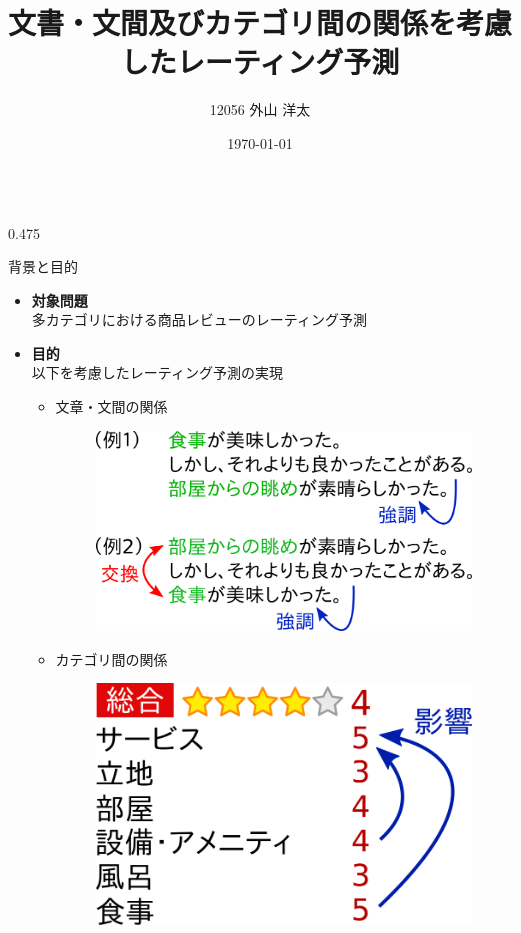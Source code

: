 \documentclass[unicode,10pt]{beamer}
\title{文書・文間及びカテゴリ間の関係を考慮したレーティング予測}
\institute{知能数理研究室}
\author{12056 外山 洋太}
\date{\today}
\newcommand{\itemtitle}[1]{\textbf{#1}\\}
\newcommand{\columnsize}{0.475\textwidth}
\begin{document}
\begin{frame}
\begin{columns}[onlytextwidth,t]

\begin{column}{\columnsize}
  \begin{block}{背景と目的}
    \begin{itemize}
      \item \itemtitle{対象問題}
            多カテゴリにおける商品レビューのレーティング予測
      \item \itemtitle{目的}
        以下を考慮したレーティング予測の実現
        \begin{itemize}
          \item 文章・文間の関係
            \begin{figure}
              \includegraphics[width=0.9\linewidth]
                              {fig/relations_among_sentences.png}
            \end{figure}
          \item カテゴリ間の関係
            \begin{figure}
              \includegraphics[width=0.6\linewidth]
                              {fig/relations_among_rating_categories.png}
            \end{figure}
        \end{itemize}
    \end{itemize}
  \end{block}


\end{column}
\end{columns}
\end{frame}
\end{document}
